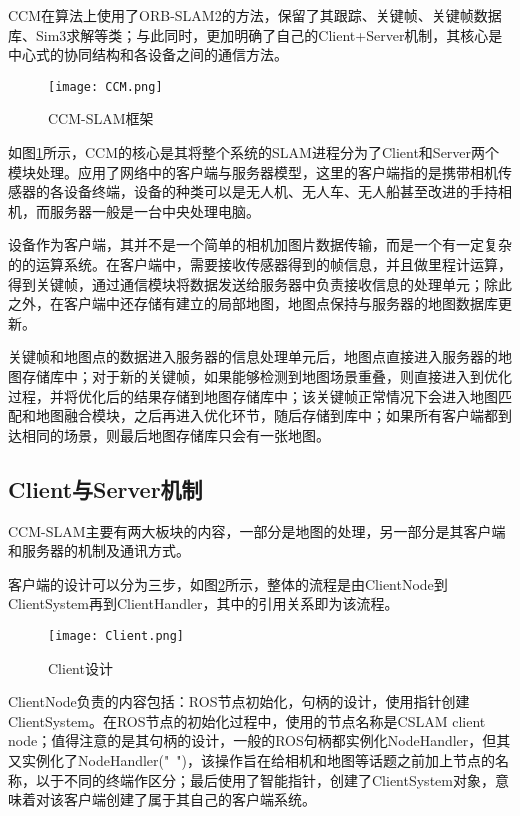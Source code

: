 CCM在算法上使用了ORB-SLAM2的方法，保留了其跟踪、关键帧、关键帧数据库、Sim3求解等类；与此同时，更加明确了自己的Client+Server机制，其核心是中心式的协同结构和各设备之间的通信方法。

\begin{figure}[!ht]
	\centering
	\texttt{[image: CCM.png]}
	\caption{CCM-SLAM框架}
	\label{fig11}
\end{figure}

如图\ref{fig11}所示，CCM的核心是其将整个系统的SLAM进程分为了Client和Server两个模块处理。应用了网络中的客户端与服务器模型，这里的客户端指的是携带相机传感器的各设备终端，设备的种类可以是无人机、无人车、无人船甚至改进的手持相机，而服务器一般是一台中央处理电脑。

设备作为客户端，其并不是一个简单的相机加图片数据传输，而是一个有一定复杂的的运算系统。在客户端中，需要接收传感器得到的帧信息，并且做里程计运算，得到关键帧，通过通信模块将数据发送给服务器中负责接收信息的处理单元；除此之外，在客户端中还存储有建立的局部地图，地图点保持与服务器的地图数据库更新。

关键帧和地图点的数据进入服务器的信息处理单元后，地图点直接进入服务器的地图存储库中；对于新的关键帧，如果能够检测到地图场景重叠，则直接进入到优化过程，并将优化后的结果存储到地图存储库中；该关键帧正常情况下会进入地图匹配和地图融合模块，之后再进入优化环节，随后存储到库中；如果所有客户端都到达相同的场景，则最后地图存储库只会有一张地图。


\subsection{Client与Server机制} \label{3.3.2}

CCM-SLAM主要有两大板块的内容，一部分是地图的处理，另一部分是其客户端和服务器的机制及通讯方式。

客户端的设计可以分为三步，如图\ref{fig12}所示，整体的流程是由ClientNode到ClientSystem再到ClientHandler，其中的引用关系即为该流程。

\begin{figure}[!ht]
	\centering
	\texttt{[image: Client.png]}
	\caption{Client设计}
	\label{fig12}
\end{figure}

ClientNode负责的内容包括：ROS节点初始化，句柄的设计，使用指针创建ClientSystem。在ROS节点的初始化过程中，使用的节点名称是CSLAM client node；值得注意的是其句柄的设计，一般的ROS句柄都实例化NodeHandler，但其又实例化了NodeHandler("~")，该操作旨在给相机和地图等话题之前加上节点的名称，以于不同的终端作区分；最后使用了智能指针，创建了ClientSystem对象，意味着对该客户端创建了属于其自己的客户端系统。


